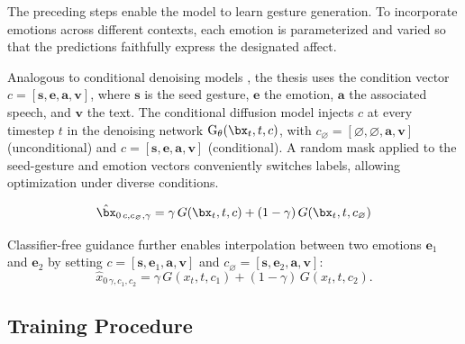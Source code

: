 The preceding steps enable the model to learn gesture generation. To incorporate emotions across different contexts, each emotion is parameterized and varied so that the predictions faithfully express the designated affect.

Analogous to conditional denoising models \cite{ho2022classifier, tevet2022human}, the thesis uses the condition vector
$c = [\mathbf{s}, \mathbf{e}, \mathbf{a}, \mathbf{v}]$,  
where $\mathbf{s}$ is the seed gesture, $\mathbf{e}$ the emotion, $\mathbf{a}$ the associated speech, and $\mathbf{v}$ the text.
The conditional diffusion model injects $c$ at every timestep $t$ in the denoising network $\text{G}_\theta(\bx_{t}, t, c)$, with
$c_{\varnothing} = [\varnothing, \varnothing, \mathbf{a}, \mathbf{v}]$ (unconditional)
and $c = [\mathbf{s}, \mathbf{e}, \mathbf{a}, \mathbf{v}]$ (conditional).
A random mask applied to the seed-gesture and emotion vectors conveniently switches labels, allowing optimization under diverse conditions.

\begin{equation} \label{eq:denoise}
	\hat{\bx}_{0\,c,c_{\varnothing},\gamma}
	= \gamma\, G(\bx_{t}, t, c) + (1-\gamma)\, G(\bx_{t}, t, c_{\varnothing})
\end{equation}

Classifier-free guidance \cite{ho2022classifier} further enables interpolation between two emotions
$\mathbf{e}_1$ and $\mathbf{e}_2$ by setting
$c = [\mathbf{s}, \mathbf{e}_{1}, \mathbf{a}, \mathbf{v}]$ and
$c_{\varnothing} = [\mathbf{s}, \mathbf{e}_{2}, \mathbf{a}, \mathbf{v}]$:
\[
\hat{x}_{0\,\gamma, c_{1}, c_{2}}
= \gamma\, G(x_{t}, t, c_{1}) + (1-\gamma)\, G(x_{t}, t, c_{2}).
\]

\subsection{Training Procedure}

